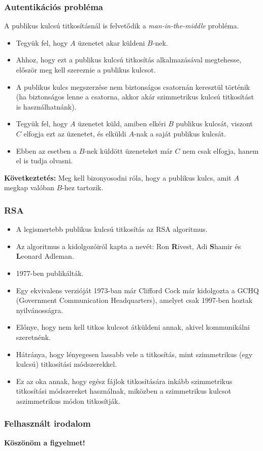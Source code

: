 \documentclass{beamer}
\begin{document}
\begin{frame}
    \frametitle{Autentikációs probléma}

    A publikus kulcsú titkosításnál is felvetődik a \textit{man-in-the-middle} probléma.

    \begin{itemize}
        \item Tegyük fel, hogy $A$ üzenetet akar küldeni $B$-nek.
        \item Ahhoz, hogy ezt a publikus kulcsú titkosítás alkalmazásával megtehesse, először meg kell szereznie a
              publikus kulcsot.
        \item A publikus kulcs megszerzése nem biztonságos csatornán keresztül történik (ha biztonságos lenne a csatorna,
              akkor akár szimmetrikus kulcsú titkosítást is használhatnánk).
        \item Tegyük fel, hogy $A$ üzenetet küld, amiben elkéri $B$ publikus kulcsát, viszont $C$ elfogja ezt az üzenetet,
              és elküldi $A$-nak a saját publikus kulcsát.
        \item Ebben az esetben a $B$-nek küldött üzeneteket már $C$ nem csak elfogja, hanem el is tudja olvasni.
    \end{itemize}

    \textbf{Következtetés:} Meg kell bizonyosodni róla, hogy a publikus kulcs, amit $A$ megkap valóban $B$-hez tartozik.
\end{frame}

\begin{frame}
    \frametitle{RSA}

    \begin{itemize}
        \item A legismertebb publikus kulcsú titkosítás az RSA algoritmus.
        \item Az algoritmus a kidolgozóiról kapta a nevét: Ron \textbf{R}ivest, Adi \textbf{S}hamir és \textbf{L}eonard Adleman.
        \item 1977-ben publikálták.
        \item Egy ekvivalens verzióját 1973-ban már Clifford Cock már kidolgozta a GCHQ (Government Communication Headquarters),
              amelyet csak 1997-ben hoztak nyilvánosságra.
        \item Előnye, hogy nem kell titkos kulcsot átküldeni annak, akivel kommunikálni szeretnénk.
        \item Hátránya, hogy lényegesen lassabb vele a titkosítás, mint szimmetrikus (egy kulcsú) titkosítási módszerekkel.
        \item Ez az oka annak, hogy egész fájlok titkosítására inkább szimmetrikus titkosítási módszereket használnak, miközben
              a szimmetrikus kulcsot aszimmetrikus módon titkosítják.
    \end{itemize}
\end{frame}

\begin{frame}
    \frametitle{Felhasznált irodalom}

    \printbibliography[heading=bibintoc]
\end{frame}

\begin{frame}
    \Huge
    \textbf{Köszönöm a figyelmet!}
\end{frame}
\end{document}
